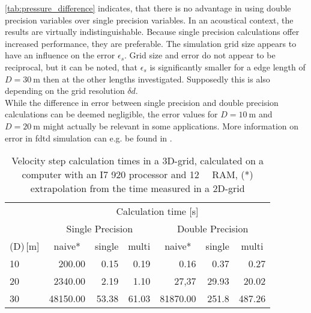 \autoref{tab:pressure_difference} indicates, that there is no advantage in using double precision variables over single precision variables. In an acoustical context, the results are virtually indistinguishable. Because single precision calculations offer increased performance, they are preferable. The simulation grid size appears to have an influence on the error $\epsilon_s$. Grid size and error do not appear to be reciprocal, but it can be noted, that $\epsilon_s$ is significantly smaller for a edge length of $D=\SI{30}{\meter}$ then at the other lengths investigated. Supposedly this is also depending on the grid resolution $\delta d$.\\
While the difference in error between single precision and double precision calculations can be deemed negligible, the error values for $D=\SI{10}{\meter}$ and $D=\SI{20}{\meter}$ might actually be relevant in some applications. More information on error in \gls{fdtd} simulation can e.g. be found in \citep{fdtderror}.



\begin{table}[h]
\centering
\caption{Velocity step calculation times in a 3D-grid, calculated on a computer with an I7 920 processor and \SI{12}{\giga\byte} RAM, (*) extrapolation from the time measured in a 2D-grid}
\label{tab:times}
\begin{tabular}{l|c|r|r|r|r|r}
                                         & \multicolumn{6}{c}{Calculation time [\si{\second}]}                                                                                                                             \\ \cline{2-7} 
                                         & \multicolumn{3}{c|}{Single Precision}                                                    & \multicolumn{3}{c}{Double Precision}                                                 \\ \hline
\multicolumn{1}{l|}{(D)\,[\si{\meter}]} & naive*                        & \multicolumn{1}{c|}{single} & \multicolumn{1}{c|}{multi} & \multicolumn{1}{c|}{naive*} & \multicolumn{1}{c|}{single} & \multicolumn{1}{c}{multi} \\ \hline
10                                       & \multicolumn{1}{r|}{200.00}   & 0.15                        & 0.19                       & 0.16                        & 0.37                        & 0.27                      \\
20                                       & \multicolumn{1}{r|}{2340.00}  & 2.19                        & 1.10                       & 27,37                       & 29.93                       & 20.02                     \\
30                                       & \multicolumn{1}{r|}{48150.00} & 53.38                       & 61.03                      & 81870.00                            & 251.8                            & 487.26                         
\end{tabular}
\end{table}


